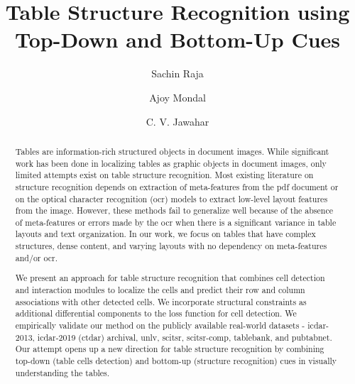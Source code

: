 \documentclass[runningheads]{llncs}
\begin{document}
\pagestyle{headings}
\mainmatter
\def\ECCV16SubNumber{6007}  

\title{Table Structure Recognition using Top-Down and Bottom-Up Cues} 

\author{Sachin Raja \and Ajoy Mondal \and C. V. Jawahar}

\maketitle

\begin{abstract}

Tables are information-rich structured objects in document images. While significant work has been done in localizing tables as graphic objects in document images, only limited attempts exist on table structure recognition. Most existing literature on structure recognition depends on extraction of meta-features from the {\sc pdf} document or on the optical character recognition ({\sc ocr}) models to extract low-level layout features from the image. However, these methods fail to generalize well because of the absence of meta-features or errors made by the {\sc ocr} when there is a significant variance in table layouts and text organization. In our work, we focus on tables that have complex structures, dense content, and varying layouts with no dependency on meta-features and/or {\sc ocr}.

We present an approach for table structure recognition that combines cell detection and interaction modules to localize the cells and predict their row and column associations with other detected cells. We incorporate structural constraints as additional differential components to the loss function for cell detection. We empirically validate our method on the publicly available real-world datasets - {\sc icdar}-2013, {\sc icdar}-2019 (c{\sc td}a{\sc r}) archival, {\sc unlv}, {\sc s}ci{\sc tsr}, {\sc s}ci{\sc tsr-comp}, {\sc t}able{\sc b}ank, and {\sc p}ub{\sc t}ab{\sc n}et. Our attempt opens up a new direction for table structure recognition by combining top-down (table cells detection) and bottom-up (structure recognition) cues in visually understanding the tables.

\end{abstract}
\end{document}
